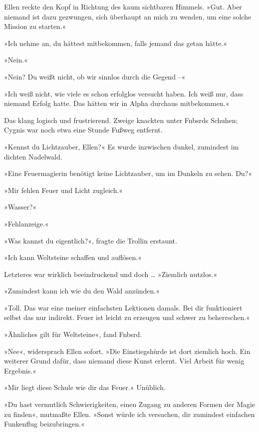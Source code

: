 Ellen reckte den Kopf in Richtung des kaum sichtbaren Himmels. »Gut. Aber niemand ist dazu gezwungen, sich überhaupt an mich zu wenden, um eine solche Mission zu starten.«

»Ich nehme an, du hättest mitbekommen, falls jemand das getan hätte.«

»Nein.«

»Nein? Du weißt nicht, ob wir sinnlos durch die Gegend –«

»Ich weiß nicht, wie viele es schon erfolglos versucht haben. Ich weiß nur, dass niemand Erfolg hatte. Das hätten wir in Alpha durchaus mitbekommen.«

Das klang logisch und frustrierend. Zweige knackten unter Fnbsrds Schuhen; Cygnis war noch etwa eine Stunde Fußweg entfernt.

\cleardoubleevenpage



»Kennst du Lichtzauber, Ellen?« Es wurde inzwischen dunkel, zumindest im dichten Nadelwald.

»Eine Feuermagierin benötigt keine Lichtzauber, um im Dunkeln zu sehen. Du?«

»Mir fehlen Feuer und Licht zugleich.«

»Wasser?«

»Fehlanzeige.«

»Was kannst du eigentlich?«, fragte die Trollin erstaunt.

»Ich kann Weltsteine schaffen und auflösen.«

Letzteres war wirklich beeindruckend und doch … »Ziemlich nutzlos.«

»Zumindest kann ich wie du den Wald anzünden.«

»Toll. Das war eine meiner einfachsten Lektionen damals. Bei dir funktioniert selbst das nur indirekt. Feuer ist leicht zu erzeugen und schwer zu beherrschen.«

»Ähnliches gilt für Weltsteine«, fand Fnbsrd.

»Nee«, widersprach Ellen sofort. »Die Einstiegshürde ist dort ziemlich hoch. Ein weiterer Grund dafür, dass niemand diese Kunst erlernt. Viel Arbeit für wenig Ergebnis.«

»Mir liegt diese Schule wie dir das Feuer.« Unüblich.

»Du hast vermutlich Schwierigkeiten, einen Zugang zu anderen Formen der Magie zu finden«, mutmaßte Ellen. »Sonst würde ich versuchen, dir zumindest einfachen Funkenflug beizubringen.«

